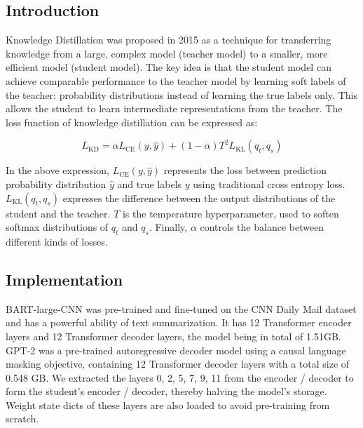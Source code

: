 \documentclass{article}
\begin{document}
    \subsection{Introduction}
    \hspace*{1em} Knowledge Distillation\cite{Hinton2015} was proposed in 2015 as a technique for transferring knowledge from a large, complex model (teacher model) to a smaller, more efficient model (student model). The key idea is that the student model can achieve comparable performance to the teacher model by learning soft labels of the teacher: probability distributions instead of learning the true labels only. This allows the student to learn intermediate representations from the teacher. The loss function of knowledge distillation can be expressed as:

    \begin{equation}
        L_{\text{KD}} = \alpha L_{\text{CE}}(y, \hat{y}) + (1 - \alpha) T^2 L_{\text{KL}}(q_t, q_s)
    \end{equation}

    \hspace*{1em} In the above expression, $L_{\text{CE}}(y, \hat{y})$ represents the loss between prediction probability distribution $\hat{y}$ and true labels $y$ using traditional cross entropy loss. $L_{\text{KL}}(q_t, q_s)$ expresses the difference between the output distributions of the student and the teacher. $T$ is the temperature hyperparameter, used to soften softmax distributions of $q_t$ and $q_s$. Finally, $\alpha$ controls the balance between different kinds of losses.

    \subsection{Implementation}
    \hspace*{1em} BART-large-CNN\cite{lewis2020BART} was pre-trained and fine-tuned on the CNN Daily Mail dataset and has a powerful ability of text summarization. It has 12 Transformer encoder layers and 12 Transformer decoder layers, the model being in total of 1.51GB. GPT-2\cite{radford2019language} was a pre-trained autoregressive decoder model using a causal language masking objective, containing 12 Transformer decoder layers with a total size of 0.548 GB. We extracted the layers 0, 2, 5, 7, 9, 11 from the encoder / decoder to form the student's encoder / decoder, thereby halving the model's storage. Weight state dicts of these layers are also loaded to avoid pre-training from scratch.
\end{document}
